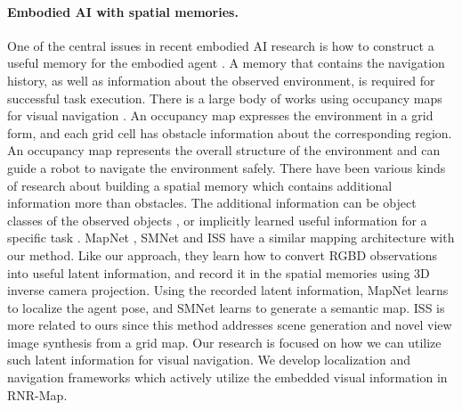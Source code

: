 \documentclass[10pt,twocolumn,letterpaper]{article}
\def\proposed{RNR-Map\xspace}
\begin{document}
\paragraph{Embodied AI with spatial memories.}
One of the central issues in recent embodied AI research is how to construct a useful memory for the embodied agent  \cite{embodied_survey}.
%
A memory that contains the navigation history, as well as information about the observed environment, is required for successful task execution.
%
There is a large body of works using occupancy maps for visual navigation \cite{occ_nav, occ_ant, occ_ans, occ_lep}. 
%
An occupancy map expresses the environment in a grid form, and each grid cell has obstacle information about the corresponding region.
%
An occupancy map represents the overall structure of the environment and can guide a robot to navigate the environment safely.
%
There have been various kinds of research about building a spatial memory which contains additional information more than obstacles.  
%
The additional information can be object classes of the observed objects \cite{sem:active, sem:MultiON, semexp, sem:smnet}, or implicitly learned useful information for a specific task \cite{imp_CMP, imp_NeuralMap, MapNet, ISS}.
%
MapNet \cite{MapNet}, SMNet \cite{sem:smnet} and ISS \cite{ISS} have a similar mapping architecture with our method.
%
Like our approach, they learn how to convert RGBD observations into useful latent information, and record it in the spatial memories using 3D inverse camera projection. 
%
Using the recorded latent information, MapNet \cite{MapNet} learns to localize the agent pose, and SMNet learns to generate a semantic map. 
% 
ISS \cite{ISS} is more related to ours since this method addresses scene generation and novel view image synthesis from a grid map.
%
Our research is focused on how we can utilize such latent information for visual navigation.
%
We develop localization and navigation frameworks which actively utilize the embedded visual information in \proposed.

\vspace{-0.5cm}
\end{document}
